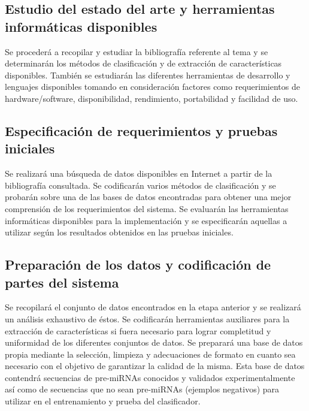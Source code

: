 \documentclass[12pt,bibliography=oldstyle,DIV=12,parskip=full-]{scrartcl}
\begin{document}
\subsection{Estudio del estado del arte y herramientas informáticas
  disponibles}
Se procederá a recopilar y estudiar la bibliografía referente al tema
y se determinarán los métodos de clasificación y de extracción de
características disponibles. También se estudiarán las diferentes
herramientas de desarrollo y lenguajes disponibles tomando en
consideración factores como requerimientos de hardware/software,
disponibilidad, rendimiento, portabilidad y facilidad de uso.
%

\subsection{Especificación de requerimientos y pruebas iniciales}
Se realizará una búsqueda de datos disponibles en Internet a partir de
la bibliografía consultada.  Se codificarán varios métodos de
clasificación y se probarán sobre una de las bases de datos
encontradas para obtener una mejor comprensión de los requerimientos
del sistema.
%
Se evaluarán las herramientas informáticas disponibles para la
implementación y se especificarán aquellas a utilizar según los
resultados obtenidos en las pruebas iniciales.
%
\subsection{Preparación de los datos y codificación de partes del sistema}
Se recopilará el conjunto de datos encontrados en la etapa anterior y
se realizará un análisis exhaustivo de éstos.  Se codificarán
herramientas auxiliares para la extracción de características si fuera
necesario para lograr completitud y uniformidad de los diferentes
conjuntos de datos.  Se preparará una base de datos propia mediante la
selección, limpieza y adecuaciones de formato en cuanto sea necesario
con el objetivo de garantizar la calidad de la misma. Esta base de
datos contendrá secuencias de pre-miRNAs conocidos y validados
experimentalmente así como de secuencias que no sean pre-miRNAs
(ejemplos negativos) para utilizar en el entrenamiento y prueba del
clasificador.
\end{document}
